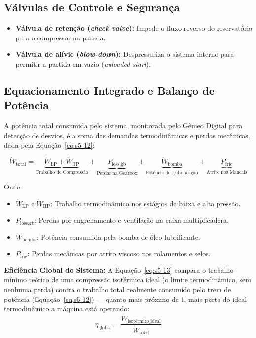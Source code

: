 \documentclass[12pt,a4paper]{article}
\numberwithin{equation}{section}
\numberwithin{table}{section}
\numberwithin{figure}{section}
\begin{document}
	\subsection{\textbf{Válvulas de Controle e Segurança}}
	\begin{itemize}
		\item \textbf{Válvula de retenção (\textit{check valve}):} Impede o fluxo reverso do reservatório para o compressor na parada.
		\item \textbf{Válvula de alívio (\textit{blow-down}):} Despressuriza o sistema interno para permitir a partida em vazio (\textit{unloaded start}).
	\end{itemize}
	
	\subsection{\textbf{Equacionamento Integrado e Balanço de Potência}}
	A potência total consumida pelo sistema, monitorada pelo Gêmeo Digital para detecção de desvios, é a soma das demandas termodinâmicas e perdas mecânicas, dada pela Equação~\eqref{eq:s5-12}:

	\begin{equation}\label{eq:s5-12}
	\dot{W}_{\text{total}} = \underbrace{\dot{W}_{\text{LP}} + \dot{W}_{\text{HP}}}_{\text{Trabalho de Compressão}} + \underbrace{P_{\text{loss,gb}}}_{\text{Perdas na Gearbox}} + \underbrace{\dot{W}_{\text{bomba}}}_{\text{Potência de Lubrificação}} + \underbrace{P_{\text{fric}}}_{\text{Atrito nos Mancais}}
\end{equation}
	
	Onde:
	\begin{itemize}
		\item $\dot{W}_{\text{LP}}$ e $\dot{W}_{\text{HP}}$: Trabalho termodinâmico nos estágios de baixa e alta pressão.
		\item $P_{\text{loss,gb}}$: Perdas por engrenamento e ventilação na caixa multiplicadora.
		\item $\dot{W}_{\text{bomba}}$: Potência consumida pela bomba de óleo lubrificante.
		\item $P_{\text{fric}}$: Perdas mecânicas por atrito viscoso nos rolamentos e selos.
	\end{itemize}
	
	\vspace{1em}
	\textbf{Eficiência Global do Sistema:} A Equação~\eqref{eq:s5-13} compara o trabalho mínimo teórico de uma compressão isotérmica ideal (o limite termodinâmico, sem nenhuma perda) contra o trabalho total realmente consumido pelo trem de potência (Equação~\eqref{eq:s5-12}) — quanto mais próximo de 1, mais perto do ideal termodinâmico a máquina está operando:
	\begin{equation}\label{eq:s5-13}
 \eta_{\text{global}} = \frac{\dot{W}_{\text{isotérmico\_ideal}}}{\dot{W}_{\text{total}}}
\end{equation}
\end{document}
